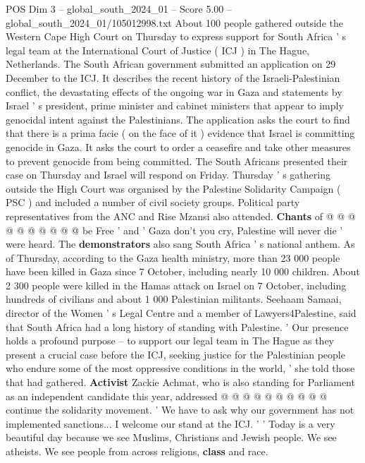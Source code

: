 \begin{textsample}{POS Dim 3 – global\_south\_2024\_01 – Score 5.00 – global\_south\_2024\_01/105012998.txt}  \label{ex:f3_pos_385}
About 100 people gathered outside the Western Cape High Court on Thursday to express support for South Africa ' s legal team at the International Court of Justice ( ICJ ) in The Hague, Netherlands.
The South African government submitted an application on 29 December to the ICJ.
It describes the recent history of the Israeli-Palestinian conflict, the devastating effects of the ongoing war in Gaza and statements by Israel ' s president, prime minister and cabinet ministers that appear to imply genocidal intent against the Palestinians.
The application asks the court to find that there is a prima facie ( on the face of it ) evidence that Israel is committing genocide in Gaza.
It asks the court to order a ceasefire and take other measures to prevent genocide from being committed.
The South Africans presented their case on Thursday and Israel will respond on Friday.
Thursday ' s gathering outside the High Court was organised by the Palestine Solidarity Campaign ( PSC ) and included a number of civil society groups.
Political party representatives from the ANC and Rise Mzansi also attended. \textbf{Chants} of @ @ @ @ @ @ @ @ @ @ be Free ' and ' Gaza don't you cry, Palestine will never die ' were heard.
The \textbf{demonstrators} also sang South Africa ' s national anthem.
As of Thursday, according to the Gaza health ministry, more than 23 000 people have been killed in Gaza since 7 October, including nearly 10 000 children.
About 2 300 people were killed in the Hamas attack on Israel on 7 October, including hundreds of civilians and about 1 000 Palestinian militants.
Seehaam Samaai, director of the Women ' s Legal Centre and a member of Lawyers4Palestine, said that South Africa had a long history of standing with Palestine. ' Our presence holds a profound purpose -- to support our legal team in The Hague as they present a crucial case before the ICJ, seeking justice for the Palestinian people who endure some of the most oppressive conditions in the world, ' she told those that had gathered. \textbf{Activist} Zackie Achmat, who is also standing for Parliament as an independent candidate this year, addressed @ @ @ @ @ @ @ @ @ @ continue the solidarity movement. ' We have to ask why our government has not implemented sanctions...
I welcome our stand at the ICJ. ' ' Today is a very beautiful day because we see Muslims, Christians and Jewish people.
We see atheists.
We see people from across religions, \textbf{class} and race.

\end{textsample}
